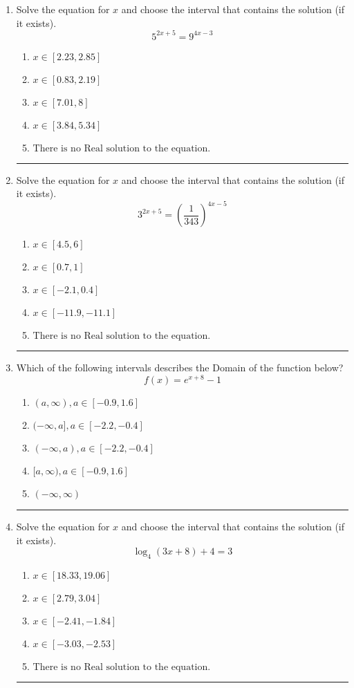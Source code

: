 \documentclass[14pt]{extbook}
\newcommand{\litem}[1]{\item#1\hspace*{-1cm}\rule{\textwidth}{0.4pt}}
\begin{document}
\begin{enumerate}
{\begin{enumerate}[label=\Alph*.]
\end{enumerate} }
\litem{
Solve the equation for $x$ and choose the interval that contains the solution (if it exists).\[ 5^{2x+5} = 9^{4x-3} \]\begin{enumerate}[label=\Alph*.]
\item \( x \in [2.23, 2.85] \)
\item \( x \in [0.83, 2.19] \)
\item \( x \in [7.01, 8] \)
\item \( x \in [3.84, 5.34] \)
\item \( \text{There is no Real solution to the equation.} \)

\end{enumerate} }
\litem{
Solve the equation for $x$ and choose the interval that contains the solution (if it exists).\[ 3^{2x+5} = \left(\frac{1}{343}\right)^{4x-5} \]\begin{enumerate}[label=\Alph*.]
\item \( x \in [4.5, 6] \)
\item \( x \in [0.7, 1] \)
\item \( x \in [-2.1, 0.4] \)
\item \( x \in [-11.9, -11.1] \)
\item \( \text{There is no Real solution to the equation.} \)

\end{enumerate} }
\litem{
Which of the following intervals describes the Domain of the function below?\[ f(x) = e^{x+8}-1 \]\begin{enumerate}[label=\Alph*.]
\item \( (a, \infty), a \in [-0.9, 1.6] \)
\item \( (-\infty, a], a \in [-2.2, -0.4] \)
\item \( (-\infty, a), a \in [-2.2, -0.4] \)
\item \( [a, \infty), a \in [-0.9, 1.6] \)
\item \( (-\infty, \infty) \)

\end{enumerate} }
\litem{
Solve the equation for $x$ and choose the interval that contains the solution (if it exists).\[ \log_{4}{(3x+8)}+4 = 3 \]\begin{enumerate}[label=\Alph*.]
\item \( x \in [18.33, 19.06] \)
\item \( x \in [2.79, 3.04] \)
\item \( x \in [-2.41, -1.84] \)
\item \( x \in [-3.03, -2.53] \)
\item \( \text{There is no Real solution to the equation.} \)


\end{enumerate}}
\end{enumerate}
\end{document}
